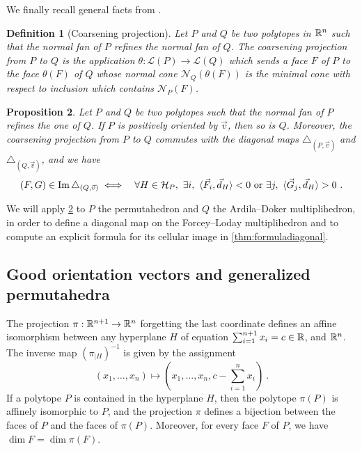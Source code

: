 \documentclass[twoside, 12pt]{amsart}
\newtheorem{definition}{Definition}[section]
\newtheorem{proposition}[definition]{Proposition}
\theoremstyle{remark}
\begin{document}
We finally recall general facts from \cite[Section 1.6]{LA21}. 

\begin{definition}[Coarsening projection] 
  \label{def:coarseningprojection} 
  Let $P$ and $Q$ be two polytopes in $\mathbb{R}^n$ such that the normal fan of $P$ refines the normal fan of $Q$. 
  The \emph{coarsening projection} from $P$ to $Q$ is the application $\theta : \mathcal{L}(P)\to\mathcal{L}(Q)$ which sends a face $F$ of $P$ to the face $\theta(F)$ of $Q$ whose normal cone $\mathcal{N}_Q(\theta(F))$ is the minimal cone with respect to inclusion which contains $\mathcal{N}_P(F)$.
\end{definition}

\begin{proposition} 
\label{prop:refinementofnormalfans}
Let $P$ and $Q$ be two polytopes such that the normal fan of $P$ refines the one of $Q$. 
If $P$ is positively oriented by $\vec v$, then so is $Q$. 
Moreover, the coarsening projection from $P$ to $Q$ commutes with the diagonal maps $\triangle_{(P,\vec v)}$ and $\triangle_{(Q,\vec v)}$, and we have 
\begin{eqnarray*}
  (F,G) \in \operatorname{Im} \triangle_{(Q,\vec v)} 
  &\iff& \forall H \in \mathcal{H}_P , \ \exists i , \ \langle \vec F_i, \vec d_H \rangle < 0  \text{ or } \exists j , \ \langle \vec G_j, \vec d_H \rangle > 0 \ .
\end{eqnarray*} 
\end{proposition}

We will apply \cref{prop:refinementofnormalfans} to $P$ the permutahedron and $Q$ the Ardila--Doker multiplihedron, in order to define a diagonal map on the Forcey--Loday multiplihedron and to compute an explicit formula for its cellular image in \cref{thm:formuladiagonal}.


\subsection{Good orientation vectors and generalized permutahedra}

The projection $\pi : \mathbb{R}^{n+1} \to \mathbb{R}^n$ forgetting the last coordinate defines an affine isomorphism between any hyperplane $H$ of equation $\sum_{i=1}^{n+1} x_i = c \in \mathbb{R}$, and $\mathbb{R}^n$. 
The inverse map $(\pi_{| H})^{-1}$ is given by the assignment \[ (x_1, \ldots, x_n) \mapsto \left(x_1, \ldots, x_n, c- \sum_{i=1}^{n}x_i\right) \ . \]
If a polytope $P$ is contained in the hyperplane $H$, then the polytope $\pi(P)$ is affinely isomorphic to $P$, and the projection $\pi$ defines a bijection between the faces of $P$ and the faces of $\pi(P)$. Moreover, for every face $F$ of $P$, we have $\dim F = \dim \pi(F)$.
\end{document}
